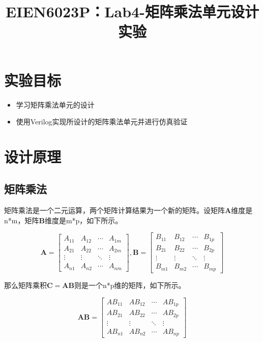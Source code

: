 \documentclass{ctexart}
\title{EIEN6023P：Lab4-矩阵乘法单元设计实验}
\author{}
\date{}
\begin{document}
\maketitle

\section{实验目标}
\begin{itemize}
    \item 学习矩阵乘法单元的设计
    \item 使用Verilog实现所设计的矩阵乘法单元并进行仿真验证
\end{itemize}


\section{设计原理}

\subsection{矩阵乘法}
矩阵乘法是一个二元运算，两个矩阵计算结果为一个新的矩阵。设矩阵$\boldsymbol{A}$维度是n*m，矩阵$\boldsymbol{B}$维度是m*p，如下所示。

$$
\boldsymbol{A} = \left[
\begin{array}{cccc}
     A_{11} & A_{12} & \cdots & A_{1m} \\
     A_{21} & A_{22} & \cdots & A_{2m} \\
     \vdots & \vdots & \ddots & \vdots \\
     A_{n1} & A_{n2} & \cdots & A_{nm}
\end{array}
\right], \boldsymbol{B} = \left[
\begin{array}{cccc}
     B_{11} & B_{12} & \cdots & B_{1p} \\
     B_{21} & B_{22} & \cdots & B_{2p} \\
     \vdots & \vdots & \ddots & \vdots \\
     B_{m1} & B_{m2} & \cdots & B_{mp}
\end{array}
\right]
$$

那么矩阵乘积$\boldsymbol{C}=\boldsymbol{AB}$则是一个n*p维的矩阵，如下所示。

$$
\boldsymbol{AB} = \left[
\begin{array}{cccc}
     AB_{11} & AB_{12} & \cdots & AB_{1p} \\
     AB_{21} & AB_{22} & \cdots & AB_{2p} \\
     \vdots & \vdots & \ddots & \vdots \\
     AB_{n1} & AB_{n2} & \cdots & AB_{np}
\end{array}
\right]
$$
\end{document}
